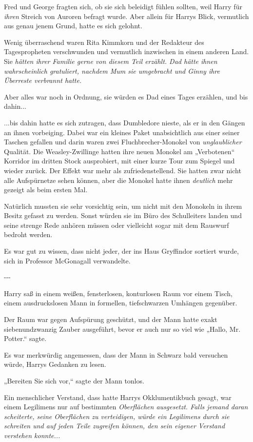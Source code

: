 {Fred und George fragten sich, ob sie sich beleidigt fühlen sollten, weil Harry für \emph{ihren} Streich von Auroren befragt wurde. Aber allein für Harrys Blick, vermutlich aus genau jenem Grund, hatte es sich gelohnt.

Wenig überraschend waren Rita Kimmkorn und der Redakteur des Tagespropheten verschwunden und vermutlich inzwischen in einem anderen Land. Sie \emph{hätten ihrer Familie gerne von diesem Teil erzählt. Dad hätte ihnen wahrscheinlich gratuliert, nachdem Mum sie umgebracht und Ginny ihre Überreste verbrannt hatte.}

Aber alles war noch in Ordnung, sie würden es Dad eines Tages erzählen, und bis dahin...

...bis dahin hatte es sich zutragen, dass Dumbledore nieste, als er in den Gängen an ihnen vorbeiging. Dabei war ein kleines Paket unabsichtlich aus einer seiner Taschen gefallen und darin waren zwei Fluchbrecher-Monokel von \emph{unglaublicher} Qualität. Die Weasley-Zwillinge hatten ihre neuen Monokel am „Verbotenen“ Korridor im dritten Stock ausprobiert, mit einer kurze Tour zum Spiegel und wieder zurück. Der Effekt war mehr als zufriedenstellend. Sie hatten zwar nicht alle Aufspürnetze sehen können, aber die Monokel hatte ihnen \emph{deutlich} mehr gezeigt als beim ersten Mal.

Natürlich mussten sie sehr vorsichtig sein, um nicht mit den Monokeln in ihrem Besitz gefasst zu werden. Sonst würden sie im Büro des Schulleiters landen und seine strenge Rede anhören müssen oder vielleicht sogar mit dem Rauswurf bedroht werden.

Es war gut zu wissen, dass nicht jeder, der ins Haus Gryffindor sortiert wurde, sich in Professor McGonagall verwandelte.

-\/-\/-

Harry saß in einem weißen, fensterlosen, konturlosen Raum vor einem Tisch, einem ausdruckslosen Mann in formellen, tiefschwarzen Umhängen gegenüber.

Der Raum war gegen Aufspürung geschützt, und der Mann hatte exakt siebenundzwanzig Zauber ausgeführt, bevor er auch nur so viel wie „Hallo, Mr. Potter.“ sagte.

Es war merkwürdig angemessen, dass der Mann in Schwarz bald versuchen würde, Harrys Gedanken zu lesen.

„Bereiten Sie sich vor,“ sagte der Mann tonlos.

Ein menschlicher Verstand, dass hatte Harrys Okklumentikbuch gesagt, war einem Legilimens nur auf bestimmten \emph{Oberflächen ausgesetzt. Falls jemand daran scheiterte, seine Oberflächen zu verteidigen, würde ein Legilimens \emph{durch} sie schreiten und auf jeden Teile zugreifen können, den sein eigener Verstand verstehen konnte...}

}
